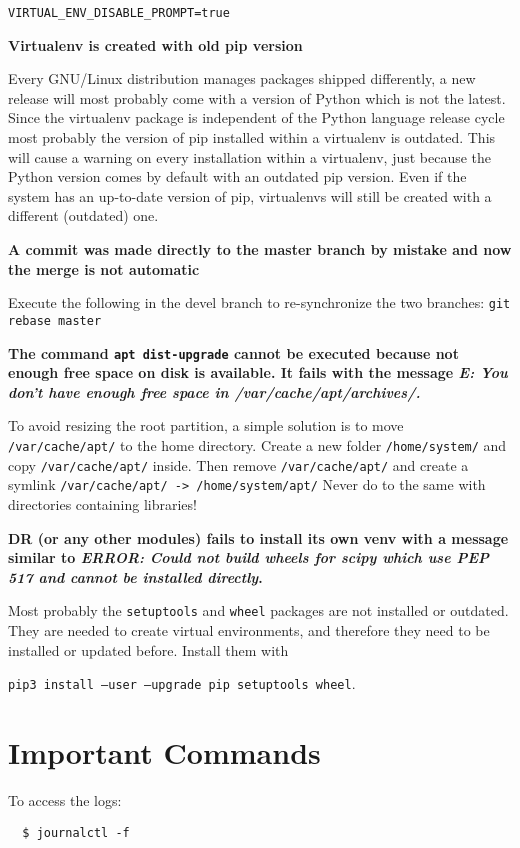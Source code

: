 \documentclass[a4paper,12pt]{article}
\begin{document}
{\tt VIRTUAL\_ENV\_DISABLE\_PROMPT=true}

\textbf{Virtualenv is created with old pip version}

Every GNU/Linux distribution manages packages shipped differently, a new release will most probably come with a version of Python which is not the latest. Since the virtualenv package is independent of the Python language release cycle most probably the version of pip installed within a virtualenv is outdated. This will cause a warning on every installation within a virtualenv, just because the Python version comes by default with an outdated pip version. Even if the system has an up-to-date version of pip, virtualenvs will still be created with a different (outdated) one.

\textbf{A commit was made directly to the master branch by mistake and now the merge is not automatic}

Execute the following in the devel branch to re-synchronize the two branches: {\tt git rebase master}

\textbf{The command {\tt apt dist-upgrade} cannot be executed because not enough free space on disk is available. It fails with the message \emph{E: You don't have enough free space in /var/cache/apt/archives/.}}

To avoid resizing the root partition, a simple solution is to move {\tt /var/cache/apt/} to the home directory.
Create a new folder {\tt /home/system/} and copy {\tt /var/cache/apt/} inside. Then remove {\tt /var/cache/apt/} and create a symlink {\tt /var/cache/apt/ -> /home/system/apt/}
Never do to the same with directories containing libraries!

\textbf{DR (or any other modules) fails to install its own venv with a message similar to \emph{ERROR: Could not build wheels for scipy which use PEP 517 and cannot be installed directly}.}

Most probably the {\tt setuptools} and {\tt wheel} packages are not installed or outdated. They are needed to create virtual environments, and therefore they need to be installed or updated before. Install them with

{\tt pip3 install --user --upgrade pip setuptools wheel}.






\section{Important Commands}
To access the logs:

\begin{verbatim}
  $ journalctl -f
\end{verbatim}
\end{document}
